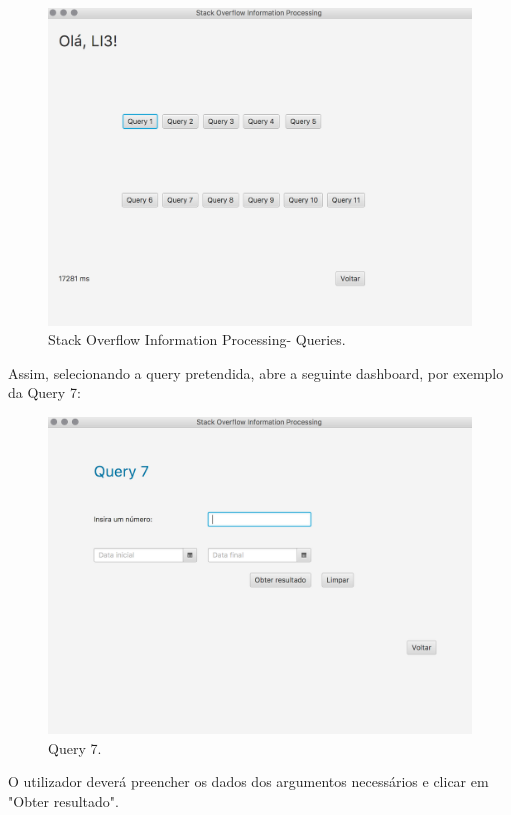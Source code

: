 \documentclass[a4paper]{article}
\begin{document}
\begin{figure}[H]
\centering
\includegraphics[scale=0.40]{imgs/inicio2.png}
\caption{Stack Overflow Information Processing-  Queries.}
\label{img:iniciolasdk}
\end{figure}

Assim, selecionando a query pretendida, abre a seguinte dashboard, por exemplo
da Query 7:

\begin{figure}[H]
\centering
\includegraphics[scale=0.40]{imgs/query7img.png}
\caption{Query 7.}
\label{img:query7img}
\end{figure}

O utilizador deverá preencher os dados dos argumentos necessários
e clicar em "Obter resultado".
\end{document}
